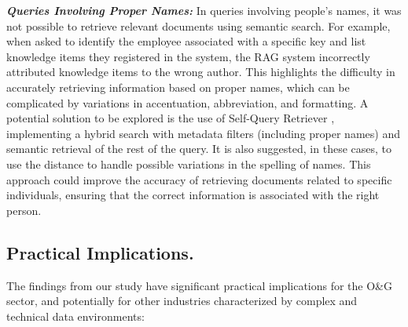             
            \setlength{\parindent}{1em}
            \textbf{\textit{Queries Involving Proper Names:}}
                In queries involving people's names, it was not possible to retrieve relevant documents using semantic search. 
                For example, when asked to identify the employee associated with a specific key and list knowledge items they registered in the system, the RAG system incorrectly attributed knowledge items to the wrong author. 
                This highlights the difficulty in accurately retrieving information based on proper names, which can be complicated by variations in accentuation, abbreviation, and formatting.
                A potential solution to be explored is the use of Self-Query Retriever \citep{LangchainSelfQuery2023}, implementing a hybrid search with metadata filters (including proper names) and semantic retrieval of the rest of the query. 
                It is also suggested, in these cases, to use the \citep{Levenshtein1966} distance to handle possible variations in the spelling of names. 
                This approach could improve the accuracy of retrieving documents related to specific individuals, ensuring that the correct information is associated with the right person.
                
        
        \subsection{Practical Implications.} 
                    The findings from our study have significant practical implications for the O\&G sector, and potentially for other industries characterized by complex and technical data environments:
                    

